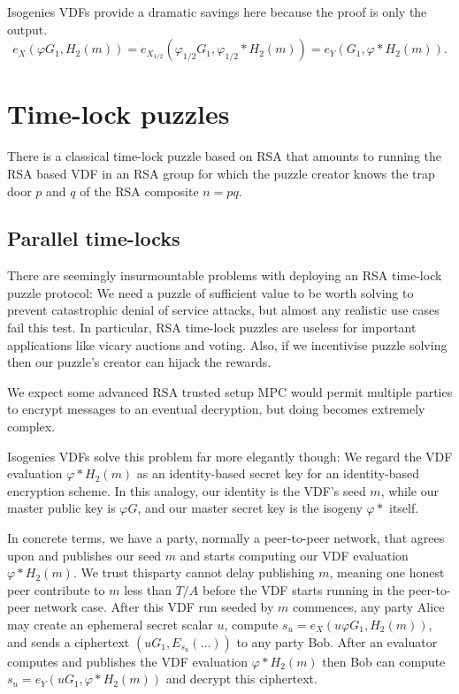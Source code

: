 \documentclass{article}
\newcommand\mathperiod{.}
\begin{document}
Isogenies VDFs provide a dramatic savings here because the proof is only the output.
$$ e_X( φ G_1, H_2(m) ) = e_{X_{1/2}}( φ_{1/2} G_1, φ_{1/2}* H_2(m) ) = e_Y( G_1, φ* H_2(m) ) \mathperiod $$


\section{Time-lock puzzles}


There is a classical time-lock puzzle based on RSA \cite{TLP} that
amounts to running the RSA based VDF in an RSA group for which the
puzzle creator knows the trap door $p$ and $q$ of the RSA composite
$n = p q$.  

\subsection{Parallel time-locks}

There are seemingly insurmountable problems with deploying an RSA
time-lock puzzle protocol:
We need a puzzle of sufficient value to be worth solving to prevent
catastrophic denial of service attacks, but almost any realistic use
cases fail this test.  In particular, RSA time-lock puzzles are
useless for important applications like vicary auctions and voting. 
Also, if we incentivise puzzle solving then our puzzle's creator can
hijack the rewards.  

We expect some advanced RSA trusted setup MPC would permit multiple
parties to encrypt messages to an eventual decryption, but doing 
becomes extremely complex.

Isogenies VDFs solve this problem far more elegantly though:
We regard the VDF evaluation $φ* H_2(m)$ as an identity-based secret
key for an identity-based encryption scheme.  In this analogy, our
identity is the VDF's seed $m$, while our master public key is $φ G$,
and our master secret key is the isogeny $φ*$ itself.

In concrete terms, we have a party, normally a peer-to-peer network,
that agrees upon and publishes our seed $m$ and starts computing our
VDF evaluation $φ* H_2(m)$.  We trust thisparty cannot delay publishing
$m$, meaning one honest peer contribute to $m$ less than $T/A$ before
the VDF starts running in the peer-to-peer network case.
After this VDF run seeded by $m$ commences, any party Alice may create
an ephemeral secret scalar $u$, compute $s_u = e_X ( u φ G_1, H_2(m) )$,
and sends a ciphertext $(u G_1, E_{s_u}(\ldots))$ to any party Bob.
After an evaluator computes and publishes the VDF evaluation
$φ* H_2(m)$ then Bob can compute $s_u = e_Y ( u G_1, φ* H_2(m) )$ and
decrypt this ciphertext.
\end{document}
